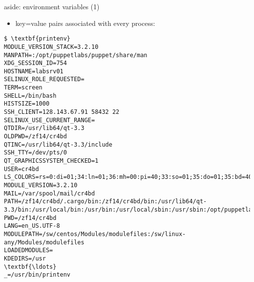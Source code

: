 
\begin{frame}[fragile,label=envVarsPrintenv]{aside: environment variables (1)}
\begin{itemize}
\item key=value pairs associated with every process:
\end{itemize}
\begin{Verbatim}[fontsize=\fontsize{8}{9}\selectfont,commandchars=\\\{\}]
$ \textbf{printenv}
MODULE_VERSION_STACK=3.2.10
MANPATH=:/opt/puppetlabs/puppet/share/man
XDG_SESSION_ID=754
HOSTNAME=labsrv01 
SELINUX_ROLE_REQUESTED=
TERM=screen
SHELL=/bin/bash 
HISTSIZE=1000 
SSH_CLIENT=128.143.67.91 58432 22 
SELINUX_USE_CURRENT_RANGE=
QTDIR=/usr/lib64/qt-3.3
OLDPWD=/zf14/cr4bd
QTINC=/usr/lib64/qt-3.3/include
SSH_TTY=/dev/pts/0
QT_GRAPHICSSYSTEM_CHECKED=1
USER=cr4bd
LS_COLORS=rs=0:di=01;34:ln=01;36:mh=00:pi=40;33:so=01;35:do=01;35:bd=40;33;01:cd=40;33;01:or=40;31;01:mi=01;05;37;41:su=37;41:sg=30;43:ca=30;41:tw=30;42:ow=34;42:st=37;44:ex=01;32:*.tar=01;31:*.tgz=01;31:*.arc=01;31:*.arj=01;31:*.taz=01;31:*.lha=01;31:*.lz4=01;31:*.lzh=01;31:*.lzma=01;31:*.tlz=01;31:*.txz=01;31:*.tzo=01;31:*.t7z=01;31:*.zip=01;31:*.z=01;31:*.Z=01;31:*.dz=01;31:*.gz=01;31:*.lrz=01;31:*.lz=01;31:*.lzo=01;31:*.xz=01;31:*.bz2=01;31:*.bz=01;31:*.tbz=01;31:*.tbz2=01;31:*.tz=01;31:*.deb=01;31:*.rpm=01;31:*.jar=01;31:*.war=01;31:*.ear=01;31:*.sar=01;31:*.rar=01;31:*.alz=01;31:*.ace=01;31:*.zoo=01;31:*.cpio=01;31:*.7z=01;31:*.rz=01;31:*.cab=01;31:*.jpg=01;35:*.jpeg=01;35:*.gif=01;35:*.bmp=01;35:*.pbm=01;35:*.pgm=01;35:*.ppm=01;35:*.tga=01;35:*.xbm=01;35:*.xpm=01;35:*.tif=01;35:*.tiff=01;35:*.png=01;35:*.svg=01;35:*.svgz=01;35:*.mng=01;35:*.pcx=01;35:*.mov=01;35:*.mpg=01;35:*.mpeg=01;35:*.m2v=01;35:*.mkv=01;35:*.webm=01;35:*.ogm=01;35:*.mp4=01;35:*.m4v=01;35:*.mp4v=01;35:*.vob=01;35:*.qt=01;35:*.nuv=01;35:*.wmv=01;35:*.asf=01;35:*.rm=01;35:*.rmvb=01;35:*.flc=01;35:*.avi=01;35:*.fli=01;35:*.flv=01;35:*.gl=01;35:*.dl=01;35:*.xcf=01;35:*.xwd=01;35:*.yuv=01;35:*.cgm=01;35:*.emf=01;35:*.axv=01;35:*.anx=01;35:*.ogv=01;35:*.ogx=01;35:*.aac=01;36:*.au=01;36:*.flac=01;36:*.mid=01;36:*.midi=01;36:*.mka=01;36:*.mp3=01;36:*.mpc=01;36:*.ogg=01;36:*.ra=01;36:*.wav=01;36:*.axa=01;36:*.oga=01;36:*.spx=01;36:*.xspf=01;36:
MODULE_VERSION=3.2.10
MAIL=/var/spool/mail/cr4bd
PATH=/zf14/cr4bd/.cargo/bin:/zf14/cr4bd/bin:/usr/lib64/qt-3.3/bin:/usr/local/bin:/usr/bin:/usr/local/sbin:/usr/sbin:/opt/puppetlabs/bin:/usr/cs/contrib/bin:.
PWD=/zf14/cr4bd
LANG=en_US.UTF-8
MODULEPATH=/sw/centos/Modules/modulefiles:/sw/linux-any/Modules/modulefiles
LOADEDMODULES=
KDEDIRS=/usr
\textbf{\ldots}
_=/usr/bin/printenv
\end{Verbatim}
\end{frame}

